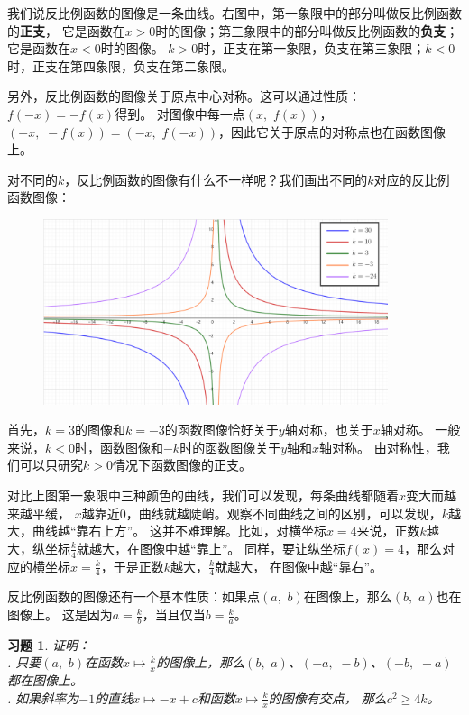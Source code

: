 \documentclass[12pt,UTF8]{ctexbook}
\newtheorem{xt}{习题}[section]
\begin{document}
我们说反比例函数的图像是一条曲线。右图中，第一象限中的部分叫做反比例函数的\textbf{正支}，
它是函数在$x>0$时的图像；第三象限中的部分叫做反比例函数的\textbf{负支}；它是函数在$x<0$时的图像。
$k>0$时，正支在第一象限，负支在第三象限；$k<0$时，正支在第四象限，负支在第二象限。

另外，反比例函数的图像关于原点中心对称。这可以通过性质：$f(-x) = -f(x)$得到。
对图像中每一点$(x, \,\,f(x))$，$(-x, \,\,-f(x)) = (-x, \,\,f(-x))$，因此它关于原点的对称点也在函数图像上。

对不同的$k$，反比例函数的图像有什么不一样呢？我们画出不同的$k$对应的反比例函数图像：

\begin{figure}[h] %
    \centering
    \includegraphics[width=0.9\textwidth]{tu/反比例函数2.png}
\end{figure}

首先，$k=3$的图像和$k=-3$的函数图像恰好关于$y$轴对称，也关于$x$轴对称。
一般来说，$k<0$时，函数图像和$-k$时的函数图像关于$y$轴和$x$轴对称。
由对称性，我们可以只研究$k>0$情况下函数图像的正支。

对比上图第一象限中三种颜色的曲线，我们可以发现，每条曲线都随着$x$变大而越来越平缓，
$x$越靠近$0$，曲线就越陡峭。观察不同曲线之间的区别，可以发现，$k$越大，曲线越“靠右上方”。
这并不难理解。比如，对横坐标$x = 4$来说，正数$k$越大，纵坐标$\frac{k}{4}$就越大，在图像中越“靠上”。
同样，要让纵坐标$f(x) = 4$，那么对应的横坐标$x = \frac{k}{4}$，于是正数$k$越大，$\frac{k}{4}$就越大，
在图像中越“靠右”。

反比例函数的图像还有一个基本性质：如果点$(a, \,\,b)$在图像上，那么$(b, \,\,a)$也在图像上。
这是因为$a = \frac{k}{b}$，当且仅当$b = \frac{k}{a}$。
\begin{xt}\label{xt:5-0-0}
    证明：\\
    . 只要$(a, \,\,b)$在函数$x \mapsto \frac{k}{x}$的图像上，那么$(b, \,\,a)$、$(-a, \,\,-b)$、$(-b, \,\,-a)$
    都在图像上。\\
    . 如果斜率为$-1$的直线$x\mapsto -x + c$和函数$ x \mapsto \frac{k}{x}$的图像有交点，
    那么$c^2 \geqslant 4k$。
\end{xt}
\end{document}
